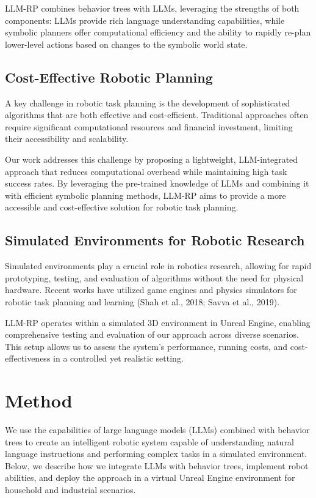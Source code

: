 \documentclass[pdflatex,sn-mathphys-num]{sn-jnl}%
\theoremstyle{thmstyleone}%
\theoremstyle{thmstyletwo}%
\theoremstyle{thmstylethree}%
\begin{document}
LLM-RP combines behavior trees with LLMs, leveraging the strengths of both components: LLMs provide rich language understanding capabilities, while symbolic planners offer computational efficiency and the ability to rapidly re-plan lower-level actions based on changes to the symbolic world state.

\subsection{Cost-Effective Robotic Planning}

A key challenge in robotic task planning is the development of sophisticated algorithms that are both effective and cost-efficient. Traditional approaches often require significant computational resources and financial investment, limiting their accessibility and scalability.

Our work addresses this challenge by proposing a lightweight, LLM-integrated approach that reduces computational overhead while maintaining high task success rates. By leveraging the pre-trained knowledge of LLMs and combining it with efficient symbolic planning methods, LLM-RP aims to provide a more accessible and cost-effective solution for robotic task planning.

\subsection{Simulated Environments for Robotic Research}

Simulated environments play a crucial role in robotics research, allowing for rapid prototyping, testing, and evaluation of algorithms without the need for physical hardware. Recent works have utilized game engines and physics simulators for robotic task planning and learning (Shah et al., 2018; Savva et al., 2019).

LLM-RP operates within a simulated 3D environment in Unreal Engine, enabling comprehensive testing and evaluation of our approach across diverse scenarios. This setup allows us to assess the system's performance, running costs, and cost-effectiveness in a controlled yet realistic setting.



\section{Method}
We use the capabilities of large language models (LLMs) combined with behavior trees to create an intelligent robotic system capable of understanding natural language instructions and performing complex tasks in a simulated environment. Below, we describe how we integrate LLMs with behavior trees, implement robot abilities, and deploy the approach in a virtual Unreal Engine environment for household and industrial scenarios.
\end{document}
